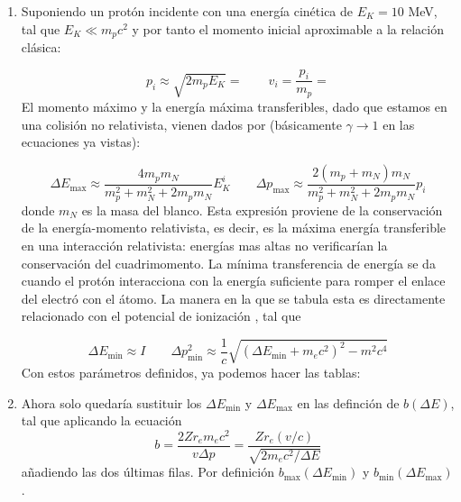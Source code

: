 \begin{enumerate}[label=\alph*)]
    \item Suponiendo un protón incidente con una energía cinética de $E_K=10$ MeV, tal que $E_K\ll m_p c^2$ y por tanto el momento inicial aproximable a la relación clásica:

    \begin{equation*}
        p_i \approx \sqrt{2 m_p E_K} =  \qquad v_i = \frac{p_i}{m_p} = 
    \end{equation*}
    El momento máximo y la energía máxima transferibles, dado que estamos en una colisión no relativista, vienen dados por (básicamente $\gamma \to 1$ en las ecuaciones ya vistas): 

    \begin{equation*}
        \Delta E_{\max} \approx \frac{4m_p m_N}{m_p^2 + m_N^2 + 2m_p m_N} E_K^i \qquad 
        \Delta p_{\max} \approx \frac{2(m_p+m_N)m_N}{m_p^2 + m_N^2 + 2m_p m_N} p_i
    \end{equation*}
    donde $m_N$ es la masa del blanco. Esta expresión proviene de la conservación de la energía-momento relativista, es decir, es la máxima energía transferible en una interacción relativista: energías mas altas no verificarían la conservación del cuadrimomento. La mínima transferencia de energía se da cuando el protón interacciona con la energía suficiente para romper el enlace del electró con el átomo. La manera en la que se tabula esta es directamente relacionado con el potencial de ionización \cite{Brau2014}, tal que 

    \begin{equation*}
        \Delta E_{\min} \approx I \qquad \Delta p_{\min}^2 \approx \frac{1}{c} \sqrt{(\Delta E_{\min}+m_ec^2)^2-m^2 c^4}
    \end{equation*}
    Con estos parámetros definidos, ya podemos hacer las tablas: 
    
    \item Ahora solo quedaría sustituir los $\Delta E_{\min}$ y $\Delta E_{\max}$ en las definción de $b(\Delta E)$, tal que aplicando la ecuación 
     \[
        b = \frac{2 Z r_e m_e c^2}{v \Delta p} = \frac{Z r_e (v/c)}{\sqrt{2 m_e c^2 / \Delta E}}
    \]
    añadiendo las dos últimas filas. Por definición $b_{\max} (\Delta E_{\min})$ y $b_{\min} (\Delta E_{\max})$.  
    

\end{enumerate}
